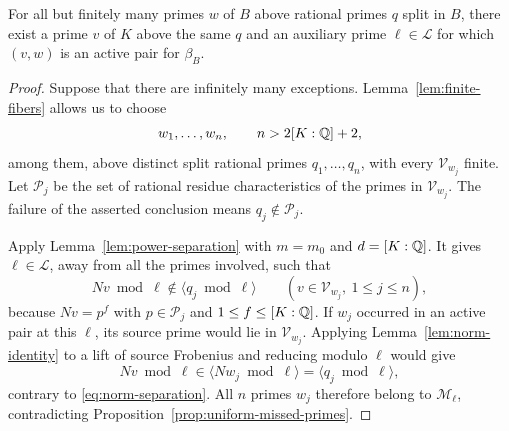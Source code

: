 \begin{proposition}\label{prop:same-characteristic}
For all but finitely many primes $w$ of $B$ above rational primes $q$ split in $B$, there exist a prime $v$ of $K$ above the same $q$ and an auxiliary prime $\ell\in\mathcal L$ for which $(v,w)$ is an active pair for $\beta_B$.
\end{proposition}
\begin{proof}
Suppose that there are infinitely many exceptions. Lemma~\ref{lem:finite-fibers} allows us to choose
\[
 w_1,\ldots,w_n,\qquad n>2[K:\mathbb Q]+2,
\]
among them, above distinct split rational primes $q_1,\ldots,q_n$, with every $\mathcal V_{w_j}$ finite. Let $\mathcal P_j$ be the set of rational residue characteristics of the primes in $\mathcal V_{w_j}$. The failure of the asserted conclusion means $q_j\notin\mathcal P_j$.

Apply Lemma~\ref{lem:power-separation} with $m=m_0$ and $d=[K:\mathbb Q]$. It gives $\ell\in\mathcal L$, away from all the primes involved, such that
\begin{equation}\label{eq:norm-separation}
 Nv\bmod\ell\notin\langle q_j\bmod\ell\rangle
 \qquad(v\in\mathcal V_{w_j},\ 1\le j\le n),
\end{equation}
because $Nv=p^f$ with $p\in\mathcal P_j$ and $1\le f\le[K:\mathbb Q]$. If $w_j$ occurred in an active pair at this $\ell$, its source prime would lie in $\mathcal V_{w_j}$. Applying Lemma~\ref{lem:norm-identity} to a lift of source Frobenius and reducing modulo $\ell$ would give
\[
 Nv\bmod\ell\in\langle Nw_j\bmod\ell\rangle
 =\langle q_j\bmod\ell\rangle,
\]
contrary to \eqref{eq:norm-separation}. All $n$ primes $w_j$ therefore belong to $\mathcal M_\ell$, contradicting Proposition~\ref{prop:uniform-missed-primes}.
\end{proof}

